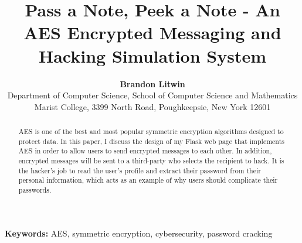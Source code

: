\documentclass[conference]{csce}
\title{\bf Pass a Note, Peek a Note - An AES Encrypted Messaging and Hacking Simulation System}
\author{
{\bfseries Brandon Litwin}\\
Department of Computer Science, School of Computer Science and Mathematics\\
Marist College, 3399 North Road, Poughkeepsie, New York 12601\\
}
\begin{document}
\maketitle                        %


\begin{abstract}
AES is one of the best and most popular symmetric encryption algorithms designed to protect data. In this paper, I discuss the design of my Flask web page that implements AES in order to allow users to send encrypted messages to each other. In addition, encrypted messages will be sent to a third-party who selects the recipient to hack. It is the hacker's job to read the user's profile and extract their password from their personal information, which acts as an example of why users should complicate their passwords.
\end{abstract}


\vspace{1em}
\noindent\textbf{Keywords:}
 {\small  AES, symmetric encryption, cybersecurity, password cracking} 

\end{document}
